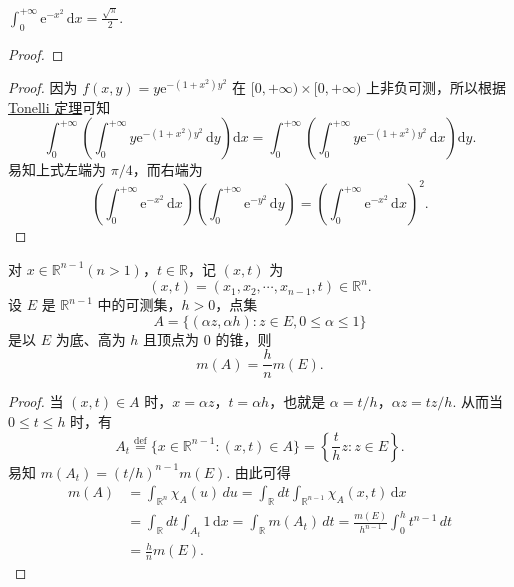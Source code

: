 \documentclass[../../main.tex]{subfiles}
\begin{document}
\begin{example}
$\int_0^{+\infty} \mathrm{e}^{-x^2} \, \mathrm{d}x = \frac{\sqrt{\pi}}{2}.$
\end{example}
\begin{proof}

\end{proof}
\begin{proof}
因为 \( f(x, y) = y \mathrm{e}^{-(1 + x^2)y^2} \) 在 \( [0, +\infty) \times [0, +\infty) \) 上非负可测，所以根据\hyperref[theorem:Tonelli 定理 非负可测函数的情形]{Tonelli 定理}可知
\[
\int_0^{+\infty} \left( \int_0^{+\infty} y \mathrm{e}^{-(1 + x^2)y^2} \, \mathrm{d}y \right) \mathrm{d}x = \int_0^{+\infty} \left( \int_0^{+\infty} y \mathrm{e}^{-(1 + x^2)y^2} \, \mathrm{d}x \right) \mathrm{d}y.
\]
易知上式左端为 \( \pi/4 \)，而右端为
\[
\left( \int_0^{+\infty} \mathrm{e}^{-x^2} \, \mathrm{d}x \right) \left( \int_0^{+\infty} \mathrm{e}^{-y^2} \, \mathrm{d}y \right) = \left( \int_0^{+\infty} \mathrm{e}^{-x^2} \, \mathrm{d}x \right)^2.
\]
\end{proof}

\begin{example}
对 \( x \in \mathbb{R}^{n - 1} (n > 1) \)，\( t \in \mathbb{R} \)，记 \( (x, t) \) 为
\[
(x, t) = (x_1, x_2, \cdots, x_{n - 1}, t) \in \mathbb{R}^n.
\]
设 \( E \) 是 \( \mathbb{R}^{n - 1} \) 中的可测集，\( h > 0 \)，点集
\[
A = \{ (\alpha z, \alpha h) : z \in E, 0 \leqslant \alpha \leqslant 1 \}
\]
是以 \( E \) 为底、高为 \( h \) 且顶点为 0 的锥，则
\[
m(A) = \frac{h}{n} m(E).
\]
\end{example}
\begin{proof}
当 \( (x, t) \in A \) 时，\( x = \alpha z \)，\( t = \alpha h \)，也就是 \( \alpha = t/h \)，\( \alpha z = t z / h \). 从而当 \( 0 \leqslant t \leqslant h \) 时，有
\[
A_t \stackrel{\text{def}}{=} \{ x \in \mathbb{R}^{n - 1} : (x, t) \in A \} = \left\{ \frac{t}{h} z : z \in E \right\}.
\]
易知 \( m(A_t) = (t/h)^{n - 1} m(E) \). 由此可得
\begin{align*}
m(A) &= \int_{\mathbb{R}^n} \chi_A(u) \, du = \int_{\mathbb{R}} dt \int_{\mathbb{R}^{n - 1}} \chi_A(x, t) \, \mathrm{d}x \\
&= \int_{\mathbb{R}} dt \int_{A_t} 1 \, \mathrm{d}x = \int_{\mathbb{R}} m(A_t) \, dt = \frac{m(E)}{h^{n - 1}} \int_0^h t^{n - 1} \, dt \\
&= \frac{h}{n} m(E).
\end{align*}
\end{proof}
\end{document}
